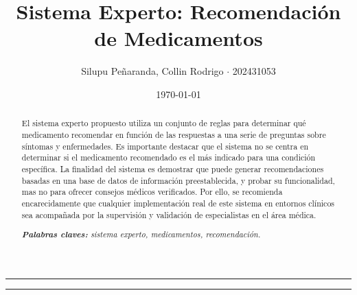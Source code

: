 \documentclass[11pt]{article}
\title{\LARGE\textbf{Sistema Experto: Recomendación de Medicamentos}}
\author{\normalsize{Silupu Peñaranda, Collin Rodrigo $\cdot$ 202431053}}
\date{\small{\today}}
\begin{document}
\renewcommand{\BOthers}[1]{et al.\hbox{}}


\maketitle


\hrule

\begin{abstract}
\noindent %
El sistema experto propuesto utiliza un conjunto de reglas para determinar qué medicamento recomendar en función de las respuestas a una serie de preguntas sobre síntomas y enfermedades.
Es importante destacar que el sistema no se centra en determinar si el medicamento recomendado es el más indicado para una condición específica. La finalidad del sistema es demostrar que puede generar recomendaciones basadas en una base de datos de información preestablecida, y probar su funcionalidad, mas no para ofrecer consejos médicos verificados. Por ello, se recomienda encarecidamente que cualquier implementación real de este sistema en entornos clínicos sea acompañada por la supervisión y validación de especialistas en el área médica.

\noindent\textit{\textbf{Palabras claves:} sistema experto, medicamentos, recomendación.}

\end{abstract}

\hrule
\end{document}

